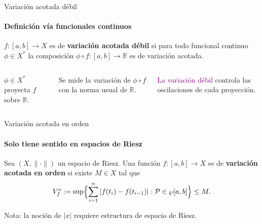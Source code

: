 \documentclass{beamer}
\begin{document}

\begin{frame}{Variación acotada débil}
\framesubtitle{Definición vía funcionales continuos}

\begin{definition}
$f:[a,b]\to X$ es de \textbf{variación acotada débil} si para todo
funcional continuo $\phi\in X^*$ la composición
$\phi\circ f:[a,b]\to\mathbb{R}$ es de variación acotada.
\end{definition}

\begin{columns}[c]

\small
$\phi\in X^*$ proyecta $f$ sobre $\mathbb{R}$.

\smallskip
Se mide la variación de $\phi\circ f$ con la norma usual de $\mathbb{R}$.

\smallskip
\textcolor{purple}{La variación débil} controla las
oscilaciones de cada proyección.

\end{columns}

\end{frame}


\begin{frame}{Variación acotada en orden}
\framesubtitle{Solo tiene sentido en espacios de Riesz}

\begin{definition}
Sea $(X,\|\cdot\|)$ un espacio de Riesz. Una función $f:[a,b]\to X$
es de \textbf{variación acotada en orden} si existe $M\in X$ tal que
\[
V_f^o := \sup\Bigl\{\sum_{i=1}^n|f(t_i)-f(t_{i-1})| :
\mathcal{P}\in\wp[a,b]\Bigr\} \le M.
\]
\end{definition}

\medskip
\alert{Nota:} la noción de $|x|$ requiere estructura de espacio de Riesz.

\end{frame}
\end{document}
